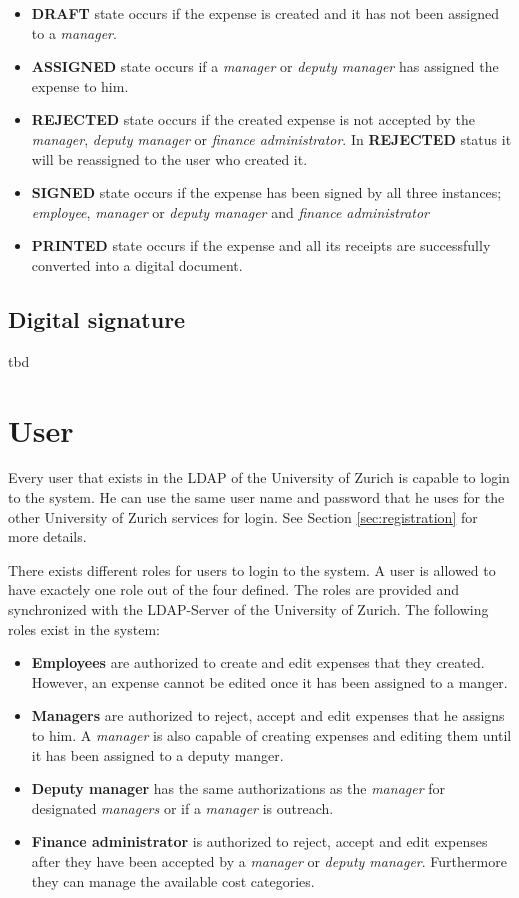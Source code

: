 \begin{itemize}
    \item \textbf{DRAFT} state occurs if the expense is created and it has not been assigned to a \textit{manager}.
    \item \textbf{ASSIGNED} state occurs if a \textit{manager} or \textit{deputy manager} has assigned the expense to him.
    \item \textbf{REJECTED} state occurs if the created expense is not accepted by the \textit{manager}, \textit{deputy manager} or \textit{finance administrator}. In \textbf{REJECTED} status it will be reassigned to the user who created it.
    \item \textbf{SIGNED} state occurs if the expense has been signed by all three instances; \textit{employee}, \textit{manager} or \textit{deputy manager} and \textit{finance administrator}
    \item \textbf{PRINTED} state occurs if the expense and all its receipts are successfully converted into a digital document.
\end{itemize}

\subsection{Digital signature}
tbd

\section{User}

Every user that exists in the LDAP of the University of Zurich is capable to login to the system. He can use the same user name and password that he uses for the other University of Zurich services for login. See Section \ref{sec:registration} for more details.  

There exists different roles for users to login to the system. A user is allowed to have exactely one role out of the four defined. The roles are provided and synchronized with the LDAP-Server of the University of Zurich. The following roles exist in the system:

\begin{itemize}
    \item \textbf{Employees} are authorized to create and edit expenses that they created. However, an expense cannot be edited once it has been assigned to a manger.
    \item \textbf{Managers} are authorized to reject, accept and edit expenses that he assigns to him. A \textit{manager} is also capable of creating expenses and editing them until it has been assigned to a deputy manger.
    \item \textbf{Deputy manager} has the same authorizations as the \textit{manager} for designated \textit{managers} or if a \textit{manager} is outreach.   
    \item \textbf{Finance administrator} is authorized to reject, accept and edit expenses after they have been accepted by a \textit{manager} or \textit{deputy manager}. Furthermore they can manage the available cost categories.
\end{itemize}

